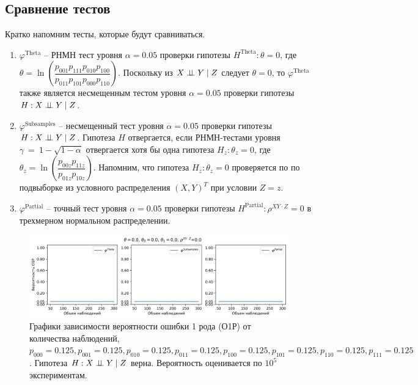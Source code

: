 \newpage
\begin{centering}
    \subsection{Сравнение тестов}\label{numerical_exp}
\end{centering}
Кратко напомним тесты, которые будут сравниваться.
\begin{enumerate}
    \item $\varphi^{\text{Theta}}$ -- РНМН тест уровня 
    $\alpha=0.05$ проверки гипотезы
    $H^{\text{Theta}}: \theta=0$, где
     $\theta = \ln  \left(\dfrac{p_{001}p_{111}p_{010}p_{100}}{p_{011}p_{101}p_{000}p_{110}}\right)$.
    Поскольку из $X \perp\!\!\!\perp Y \mid Z$ следует $\theta=0$, 
    то $\varphi^{\text{Theta}}$ также является несмещенным тестом уровня $\alpha=0.05$ проверки
    гипотезы $H:X \perp\!\!\!\perp Y \mid Z$.
    \item $\varphi^{\text{Subsamples}}$ -- несмещенный тест уровня $\alpha=0.05$
    проверки гипотезы $H: X \perp\!\!\!\perp Y \mid Z$.
    Гипотеза $H$ отвергается, если РНМН-тестами уровня 
    $\gamma~=~1-\sqrt{1-\alpha}$
    отвергается хотя бы 
    одна гипотеза $H_z: \theta_z=0$, где
    $\theta_z = \ln\left(\dfrac{p_{00z}p_{11z}}{p_{01z}p_{10z}}\right)$.
    Напомним, что гипотеза $H_z: \theta_z=0$ проверяется по 
    по подвыборке из условного распределения $(X,Y)^T$ при условии $Z=z$.
    \item $\varphi^{\text{Partial}}$ -- точный тест уровня $\alpha=0.05$
    проверки гипотезы $H^{\text{Partial}}: \rho^{XY\cdot Z}=0$ в трехмерном нормальном распределении.
\end{enumerate}

\begin{figure}[H]
    \centering
    \includegraphics[scale=0.5]{images/graph1.png}
    \caption{Графики зависимости вероятности ошибки 1 рода (О1Р) от количества наблюдений,
     $p_{000}=0.125, p_{001}=0.125, p_{010}=0.125, p_{011}=0.125,
    p_{100}=0.125, p_{101}=0.125, p_{110}=0.125, p_{111}=0.125$. 
    Гипотеза $H: X \perp\!\!\!\perp Y \mid Z$ верна.
    Вероятность оценивается по $10^5$ экспериментам.} \label{fig:1}
\end{figure}
    

